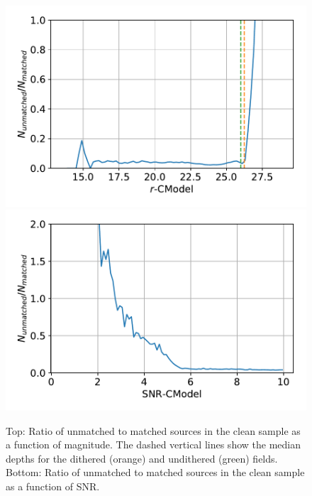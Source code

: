 \documentclass[\docopts]{\docclass}
\begin{document}
\begin{figure}
\centering
\includegraphics[width=0.9\columnwidth]{unmatched_fraction_magnitude.pdf}
\includegraphics[width=0.9\columnwidth]{unmatched_fraction_SNR.pdf}
\caption{Top: Ratio of unmatched to matched sources in the clean sample as a function of magnitude. The dashed vertical lines show the median depths for the dithered (orange) and undithered (green) fields. Bottom: Ratio of unmatched to matched sources in the clean sample as a function of SNR.}
\label{fig:snr_mag_selection}
\end{figure}
\end{document}
